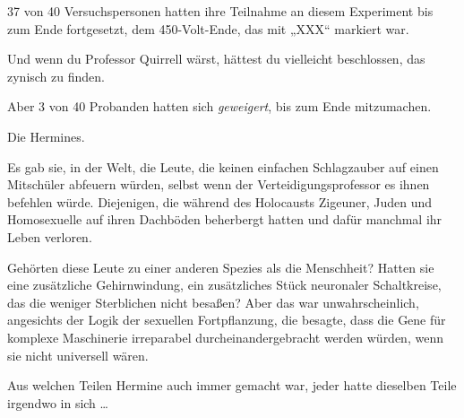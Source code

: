 37 von 40 Versuchspersonen hatten ihre Teilnahme an diesem Experiment bis zum Ende fortgesetzt, dem 450-Volt-Ende, das mit
„XXX“ markiert war.

Und wenn du Professor Quirrell wärst, hättest du vielleicht beschlossen, das zynisch zu finden.

Aber 3 von 40 Probanden hatten sich \emph{geweigert}, bis zum Ende mitzumachen.

Die Hermines.

Es gab sie, in der Welt, die Leute, die keinen einfachen Schlagzauber auf einen Mitschüler abfeuern würden, selbst wenn der Verteidigungsprofessor es ihnen befehlen würde. Diejenigen, die während des Holocausts Zigeuner, Juden und Homosexuelle auf ihren Dachböden beherbergt hatten und dafür manchmal ihr Leben verloren.

Gehörten diese Leute zu einer anderen Spezies als die Menschheit? Hatten sie eine zusätzliche Gehirnwindung, ein zusätzliches Stück neuronaler Schaltkreise, das die weniger Sterblichen nicht besaßen? Aber das war unwahrscheinlich, angesichts der Logik der sexuellen Fortpflanzung, die besagte, dass die Gene für komplexe Maschinerie irreparabel durcheinandergebracht werden würden, wenn sie nicht universell wären.

Aus welchen Teilen Hermine auch immer gemacht war, jeder hatte dieselben Teile irgendwo in sich …

